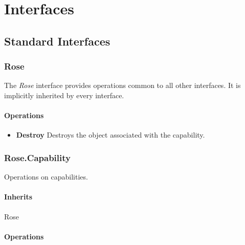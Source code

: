 \chapter{Interfaces}

\section{Standard Interfaces}

\subsection{Rose}

The {\em Rose} interface provides operations common to all other interfaces.  It is implicitly inherited by every interface.

\subsubsection{Operations}

\begin{itemize}
    \item \textbf{Destroy} Destroys the object associated with the capability.
    
\end{itemize}

\subsection{Rose.Capability}

Operations on capabilities.

\subsubsection{Inherits}

Rose

\subsubsection{Operations}


